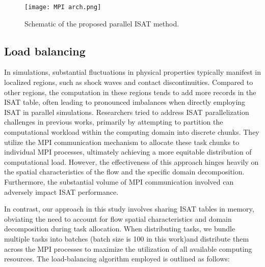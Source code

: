 
\begin{figure}[htbp]
    \centering
\texttt{[image: MPI arch.png]} 
\caption{Schematic of the proposed parallel ISAT method.}
\label{MPI_arch2} 
\end{figure}

\subsection{Load balancing}

In simulations, substantial fluctuations in physical properties typically manifest in localized regions, such as shock waves and contact discontinuities. Compared to other regions, the computation in these regions tends to add more records in the ISAT table, often leading to pronounced imbalances when directly employing ISAT in parallel simulations. Researchers tried to address ISAT parallelization challenges in previous works\cite{lu2009computationally,wu2018parallel}, primarily by attempting to partition the computational workload within the computing domain into discrete chunks. They utilize the MPI communication mechanism to allocate these task chunks to individual MPI processes, ultimately achieving a more equitable distribution of computational load. However, the effectiveness of this approach hinges heavily on the spatial characteristics of the flow and the specific domain decomposition. Furthermore, the substantial volume of MPI communication involved can adversely impact ISAT performance.

In contrast, our approach in this study involves sharing ISAT tables in memory, obviating the need to account for flow spatial characteristics and domain decomposition during task allocation. When distributing tasks, we bundle multiple tasks into batches (batch size is 100 in this work)and distribute them across the MPI processes to maximize the utilization of all available computing resources. The load-balancing algorithm employed is outlined as follows:

